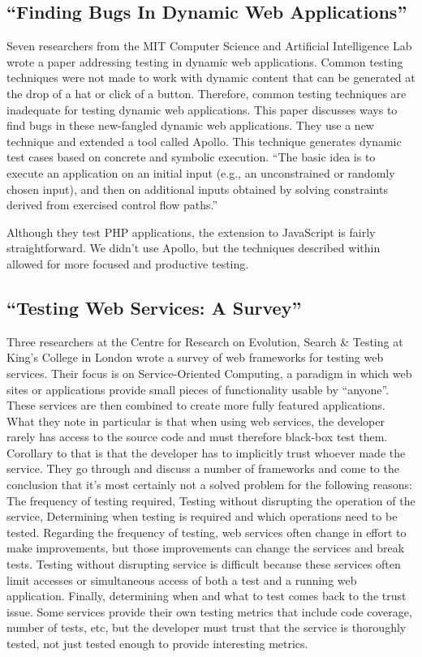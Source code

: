 \documentclass[12pt]{ucthesis}
\begin{document}
\subsection{``Finding Bugs In Dynamic Web Applications''}
Seven researchers from the MIT Computer Science and Artificial Intelligence Lab wrote a paper addressing testing in dynamic web applications\cite{FindingBugs}. Common testing techniques were not made to work with dynamic content that can be generated at the drop of a hat or click of a button. Therefore, common testing techniques are inadequate for testing dynamic web applications. This paper discusses ways to find bugs in these new-fangled dynamic web applications. They use a new technique and extended a tool called Apollo. This technique generates dynamic test cases based on concrete and symbolic execution. ``The basic idea is to execute an application on an initial input (e.g., an unconstrained or randomly chosen input), and then on additional inputs obtained by solving constraints derived from exercised control flow paths.''

Although they test PHP applications, the extension to JavaScript is fairly straightforward. We didn't use Apollo, but the techniques described within allowed for more focused and productive testing.

\subsection{``Testing Web Services: A Survey''}
Three researchers at the Centre for Research on Evolution, Search \& Testing at King's College in London wrote a survey of web frameworks for testing web services\cite{TestingWebServicesSurvey}. Their focus is on Service-Oriented Computing, a paradigm in which web sites or applications provide small pieces of functionality usable by ``anyone''. These services are then combined to create more fully featured applications. What they note in particular is that when using web services, the developer rarely has access to the source code and must therefore black-box test them. Corollary to that is that the developer has to implicitly trust whoever made the service. They go through and discuss a number of frameworks and come to the conclusion that it's most certainly not a solved problem for the following reasons: The frequency of testing required, Testing without disrupting the operation of the service, Determining when testing is required and which operations need to be tested. Regarding the frequency of testing, web services often change in effort to make improvements, but those improvements can change the services and break tests. Testing without disrupting service is difficult because these services often limit accesses or simultaneous access of both a test and a running web application. Finally, determining when and what to test comes back to the trust issue. Some services provide their own testing metrics that include code coverage, number of tests, etc, but the developer must trust that the service is thoroughly tested, not just tested enough to provide interesting metrics.
\end{document}
